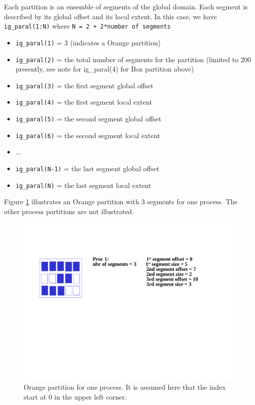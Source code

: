 Each partition is an ensemble of segments of the global domain. Each
segment is described by its global offset and its local extent.  In
this case, we have {\tt ig\_paral(1:N)} where {\tt N = 2 + 2*number of
segments}

\begin{itemize}
 \item {\tt ig\_paral(1)} = 3 (indicates a Orange partition)
 \item {\tt ig\_paral(2)} = the total number of segments for the partition (limited to 200 presently, see note for ig\_paral(4) for Box partition above)
 \item {\tt ig\_paral(3)} = the first segment global offset
 \item {\tt ig\_paral(4)} = the first segment local extent
 \item {\tt ig\_paral(5)} = the second segment global offset
 \item {\tt ig\_paral(6)} = the second segment local extent
 \item ...
 \item {\tt ig\_paral(N-1)} = the last segment global offset
 \item {\tt ig\_paral(N)} = the last segment local extent
\end{itemize}

Figure \ref{orange_partition} illustrates an Orange partition with 3 segments
for one process. The other process partitions are not illustrated.

\begin{figure}
\includegraphics[scale=.6]{figures/orange_new} 
\caption{Orange partition for one process. It is assumed here that the index start at 0 in the upper left corner.}
\label{orange_partition}
\end{figure} 

